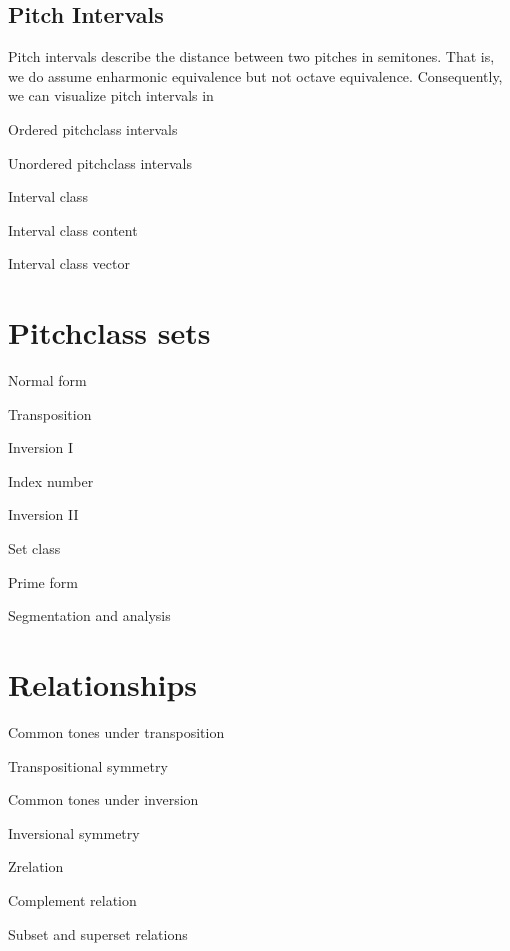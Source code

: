 \documentclass[letterpaper,10pt,english]{sphinxmanual}
\begin{document}
\subsection{Pitch Intervals}
\label{\detokenize{3_set_theory:pitch-intervals}}
\sphinxAtStartPar
Pitch intervals describe the distance between two pitches in semitones. That is, we do assume enharmonic equivalence
but not octave equivalence. Consequently, we can visualize pitch intervals in

\sphinxAtStartPar
Ordered pitch\sphinxhyphen{}class intervals

\sphinxAtStartPar
Unordered pitch\sphinxhyphen{}class intervals

\sphinxAtStartPar
Interval class

\sphinxAtStartPar
Interval class content

\sphinxAtStartPar
Interval class vector


\section{Pitch\sphinxhyphen{}class sets}
\label{\detokenize{3_set_theory:pitch-class-sets}}
\sphinxAtStartPar
Normal form

\sphinxAtStartPar
Transposition

\sphinxAtStartPar
Inversion I

\sphinxAtStartPar
Index number

\sphinxAtStartPar
Inversion II

\sphinxAtStartPar
Set class

\sphinxAtStartPar
Prime form

\sphinxAtStartPar
Segmentation and analysis


\section{Relationships}
\label{\detokenize{3_set_theory:relationships}}
\sphinxAtStartPar
Common tones under transposition

\sphinxAtStartPar
Transpositional symmetry

\sphinxAtStartPar
Common tones under inversion

\sphinxAtStartPar
Inversional symmetry

\sphinxAtStartPar
Z\sphinxhyphen{}relation

\sphinxAtStartPar
Complement relation

\sphinxAtStartPar
Subset and superset relations
\end{document}
